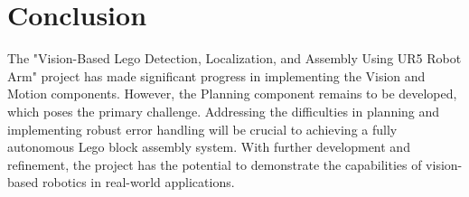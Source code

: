\documentclass{article}
\begin{document}
	\section{Conclusion}
	The "Vision-Based Lego Detection, Localization, and Assembly Using UR5 Robot Arm" project has made significant progress in implementing the Vision and Motion components. However, the Planning component remains to be developed, which poses the primary challenge. Addressing the difficulties in planning and implementing robust error handling will be crucial to achieving a fully autonomous Lego block assembly system. With further development and refinement, the project has the potential to demonstrate the capabilities of vision-based robotics in real-world applications.
	
\end{document}
